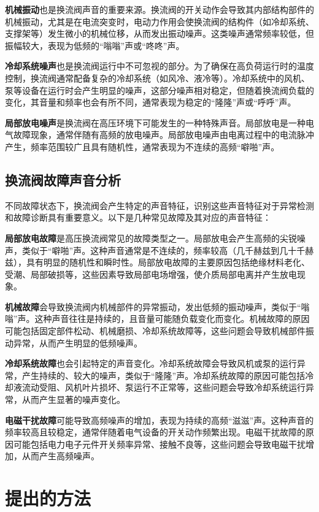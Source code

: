 \documentclass{article}
\begin{document}
\textbf{机械振动}也是换流阀声音的重要来源。换流阀的开关动作会导致其内部结构部件的机械振动，尤其是在电流突变时，电动力作用会使换流阀的结构件（如冷却系统、支撑架等）发生微小的机械位移，从而发出振动噪声。这类噪声通常频率较低，但振幅较大，表现为低频的“嗡嗡”声或“咚咚”声。

\textbf{冷却系统噪声}也是换流阀运行中不可忽视的部分。为了确保在高负荷运行时的温度控制，换流阀通常配备复杂的冷却系统（如风冷、液冷等）。冷却系统中的风机、泵等设备在运行时会产生明显的噪声，这部分噪声相对稳定，但随着换流阀负载的变化，其音量和频率也会有所不同，通常表现为稳定的“隆隆”声或“呼呼”声。

\textbf{局部放电噪声}是换流阀在高压环境下可能发生的一种特殊声音。局部放电是一种电气故障现象，通常伴随有高频的放电噪声。局部放电噪声由电离过程中的电流脉冲产生，频率范围较广且具有随机性，通常表现为不连续的高频“噼啪”声。

\subsection{ 换流阀故障声音分析}

不同故障状态下，换流阀会产生特定的声音特征，识别这些声音特征对于异常检测和故障诊断具有重要意义。以下是几种常见故障及其对应的声音特征：

\textbf{局部放电故障}是高压换流阀常见的故障类型之一。局部放电会产生高频的尖锐噪声，类似于“噼啪”声。这种声音通常是不连续的，频率较高（几千赫兹到几十千赫兹），具有明显的随机性和瞬时性。局部放电故障的主要原因包括绝缘材料老化、受潮、局部破损等，这些因素导致局部电场增强，使介质局部电离并产生放电现象。

\textbf{机械故障}会导致换流阀内机械部件的异常振动，发出低频的振动噪声，类似于“嗡嗡”声。这种声音往往是持续的，且音量可能随负载变化而变化。机械故障的原因可能包括固定部件松动、机械磨损、冷却系统故障等，这些问题会导致机械部件振动异常，从而产生明显的低频噪声。

\textbf{冷却系统故障}也会引起特定的声音变化。冷却系统故障会导致风机或泵的运行异常，产生持续的、较大的噪声，类似于“隆隆”声。冷却系统故障的原因可能包括冷却液流动受阻、风机叶片损坏、泵运行不正常等，这些问题会导致冷却系统运行异常，从而产生显著的噪声变化。

\textbf{电磁干扰故障}可能导致高频噪声的增加，表现为持续的高频“滋滋”声。这种声音的频率较高且较稳定，通常伴随着电气设备的开关动作频繁出现。电磁干扰故障的原因可能包括电力电子元件开关频率异常、接触不良等，这些问题会导致电磁干扰增加，从而产生高频噪声。

\section{提出的方法}
\end{document}

